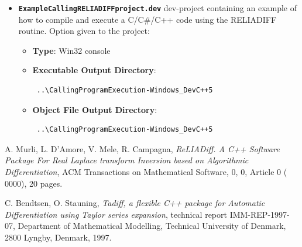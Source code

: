 \documentclass[10pt]{article}
\begin{document}
\begin{description}
\begin{itemize}
\item
{\bf {\tt ExampleCallingRELIADIFFproject.dev}}	dev-project containing an example of how to compile and execute a C/C$\#$/C++ code using the RELIADIFF routine. Option given to the project:
\begin{itemize}
\item {\bf Type}: Win32 console
\item {\bf Executable Output Directory}: \begin{verbatim} ..\CallingProgramExecution-Windows_DevC++5 \end{verbatim}
\item {\bf Object File Output Directory}: \begin{verbatim} ..\CallingProgramExecution-Windows_DevC++5 \end{verbatim}
\end{itemize}
\end{itemize}

\end{description}


\newpage

\begin{thebibliography}{10}

  	 A. Murli, L. D'Amore, V. Mele, R. Campagna, \emph{ReLIADiff. A C++ Software Package For Real Laplace
transform Inversion based on Algorithmic Differentiation}, ACM Transactions on Mathematical Software,
0, 0, Article 0 ( 0000), 20 pages.

 	C. Bendtsen, O. Stauning, \emph{ Tadiff, a flexible C++ package for Automatic Differentiation using Taylor series expansion}, technical report IMM-REP-1997-07, Department of Mathematical Modelling, Technical University of Denmark, 2800 Lyngby, Denmark, 1997.

\end{thebibliography}
\end{document}
